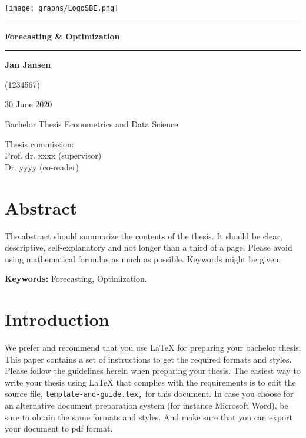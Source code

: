 \documentclass[a4paper,11pt]{article}
\theoremstyle{plain}
\theoremstyle{definition}
\begin{document}

\thispagestyle{empty}

\texttt{[image: graphs/LogoSBE.png]}

\vspace*{3cm}

\noindent
\rule{\textwidth}{0.8pt}
\begin{center}
{\huge\bf
\noindent
Forecasting \& Optimization
}
\end{center}

\vspace*{-8pt}
\noindent
\rule{\textwidth}{0.8pt}

\vspace*{2cm}

\begin{center}
{\LARGE\bf
Jan Jansen
}

{\Large
\vspace*{0.5cm}
(1234567)


\vspace*{2cm}

30 June 2020
}
\end{center}

\vspace*{2cm}

{\Large
\noindent
Bachelor Thesis Econometrics and Data Science
}

\vspace*{1cm}

{\Large
\noindent
Thesis commission:\\[0.3cm]
Prof. dr. xxxx (supervisor)\\[0.3cm]
Dr. yyyy (co-reader)
}


\newpage

\setcounter{page}{1}

\section*{Abstract}
The abstract should summarize the contents of the thesis.
It should be clear, descriptive, self-explanatory and not longer
than a third of a page. Please avoid using mathematical
formulas as much as possible.
Keywords might be given.

\bigskip\noindent
\textbf{Keywords:} Forecasting, Optimization.

\section{Introduction}\label{s:intro}
We prefer and recommend that you use LaTeX for preparing your
bachelor thesis.
This paper contains a set of instructions to get the required formats and styles.
Please follow the guidelines herein when preparing your thesis.
The easiest way to write your thesis using LaTeX that complies with the
requirements is to edit the source file, \texttt{template-and-guide.tex,}
for this document. In case you choose for an alternative document preparation system
(for instance Microsoft Word), be sure to obtain the same formats and styles.
And make sure that you can export your document to pdf format.
\end{document}
